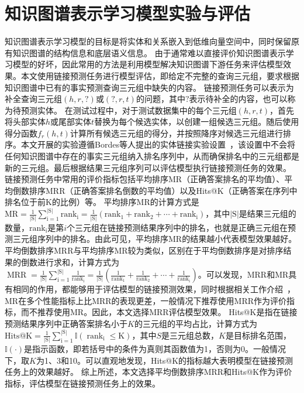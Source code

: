 \documentclass[algorithmlist, AutoFakeBold, AutoFakeSlant, figurelist, tablelist, nomlist, masters]{seuthesix}
\begin{document}
\section{知识图谱表示学习模型实验与评估}
知识图谱表示学习模型的目标是将实体和关系嵌入到低维向量空间中，同时保留原有知识图谱的结构信息和底层语义信息。
由于通常难以直接评价知识图谱表示学习模型的好坏，因此常用的方法是利用模型解决知识图谱下游任务来评估模型效果。本文使用链接预测任务进行模型评估，即给定不完整的查询三元组，要求根据知识图谱中已有的事实预测查询三元组中缺失的内容。
链接预测任务可以表示为补全查询三元组$\left(h, r, ?\right)$或$\left(?, r, t\right)$的问题，其中$?$表示待补全的内容，也可以称为待预测实体。
在测试过程中，对于测试数据集中的每个三元组$\left(h, r, t\right)$，首先将头部实体$h$或尾部实体$t$替换为每个候选实体，以创建一组候选三元组。随后使用得分函数$f_r\left(h, t\right)$计算所有候选三元组的得分，并按照降序对候选三元组进行排序。本文开展的实验遵循Bordes等人提出的实体链接实验设置~\cite{bordes2013translating}，该设置中不会将任何知识图谱中存在的事实三元组纳入排名序列中，从而确保排名中的三元组都是新的三元组。最后根据结果三元组序列可以评估模型执行链接预测任务的效果。
链接预测任务中常用的评价指标包括平均排序MR（正确答案排名的平均值）、平均倒数排序MRR（正确答案排名倒数的平均值）以及Hits@K（正确答案在序列中排名位于前K的比例）等。
平均排序MR的计算方式是$\mathrm{MR}=\frac{1}{|\mathrm{S}|} \sum_{\mathrm{i}=1}^{|\mathrm{S}|} \mathrm{rank}_{\mathrm{i}}=\frac{1}{|\mathrm{S}|}\left(\mathrm{rank}_1+\mathrm{rank}_2+\cdots+\mathrm{rank}_{\mathrm{i}}\right)$，其中$|\mathrm{S}|$是结果三元组的数量，$\mathrm{rank}_{\mathrm{i}}$是第$i$个三元组在链接预测结果序列中的排名，也就是正确三元组在预测三元组序列中的排名。由此可见，平均排序MR的结果越小代表模型效果越好。
平均倒数排序MRR与平均排序MR较为类似，区别在于平均倒数排序是对排序结果的倒数进行求和，计算方式为$\operatorname{MRR}=\frac{1}{|\mathrm{S}|} \sum_{\mathrm{i}=1}^{|\mathrm{S}|} \frac{1}{\mathrm{rank}_{\mathrm{i}}}=\frac{1}{|\mathrm{S}|}\left(\frac{1}{\mathrm{rank}_1}+\frac{1}{\mathrm{rank}_2}+\cdots+\frac{1}{\mathrm{rank}_{\mathrm{i}}}\right)$。可以发现，MRR和MR具有相同的作用，都能够用于评估模型的链接预测效果，同时根据相关工作介绍~\cite{hoyt2022unified}，MR在多个性能指标上比MRR的表现更差，一般情况下推荐使用MRR作为评价指标，而不推荐使用MR。因此，本文选择MRR评估模型效果。
Hits@K是指在链接预测结果序列中正确答案排名小于$K$的三元组的平均占比，计算方式为$\mathrm{Hits@K}=\frac{1}{|\mathrm{S}|} \sum_{\mathrm{i}=1}^{|\mathrm{S}|} \mathbb{I}\left(\operatorname{rank}_{\mathrm{i}} \leq \mathrm{K}\right)$，其中$S$是三元组总数，$K$是目标排名范围，$\mathbb{I}\left(\cdot\right)$是指示函数，即若括号中的条件为真则其函数值为1，否则为0。一般情况下，取$K$为1、3和10。可以直观地发现，Hits@K的指标越大表明模型在链接预测任务上的效果越好。
综上所述，本文选择平均倒数排序MRR和Hits@K作为评价指标，评估模型在链接预测任务上的效果。
\end{document}
